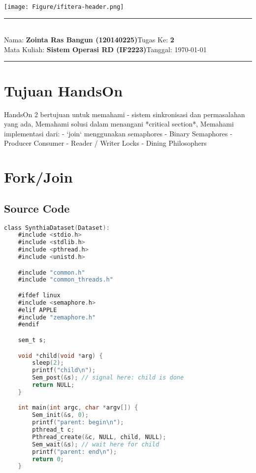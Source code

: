\documentclass[11pt,a4paper]{article}
\newcommand{\stuid}{120140225}
\newcommand{\student}{\textbf{Zointa Ras Bangun (\stuid{})}}
\newcommand{\course}{\textbf{Sistem Operasi RD (IF2223)}}
\newcommand{\assignment}{\textbf{2}} %
\begin{document}
\thispagestyle{empty}
\begin{center}
	\texttt{[image: Figure/ifitera-header.png]}
	\vspace{0.1cm}
\end{center}
\noindent
{\large
\rule{17cm}{0.2cm}\\[0.3cm]
Nama: \student \hfill Tugas Ke: \assignment\\[0.1cm]
Mata Kuliah: \course \hfill Tanggal: \today\\
\rule{17cm}{0.05cm}
\vspace{0.1cm}
}


\section{Tujuan HandsOn}
    HandsOn 2 bertujuan untuk memahami - sistem sinkronisasi dan permasalahan yang ada, Memahami solusi dalam menangani *critical section*, Memahami implementasi dari:
    - `join` menggunakan semaphores
- Binary Semaphores
- Producer Consumer
- Reader / Writer Locks
- Dining Philosophers
    
\section{\textbf{Fork}/Join}
\subsection{Source Code}
    \begin{lstlisting}[language=C,label={labelkode}]
    class SynthiaDataset(Dataset):
    #include <stdio.h>
    #include <stdlib.h>
    #include <pthread.h>
    #include <unistd.h>

    #include "common.h"
    #include "common_threads.h"

    #ifdef linux
    #include <semaphore.h>
    #elif APPLE
    #include "zemaphore.h"
    #endif

    sem_t s;

    void *child(void *arg) {
        sleep(2);
        printf("child\n");
        Sem_post(&s); // signal here: child is done
        return NULL;
    }

    int main(int argc, char *argv[]) {
        Sem_init(&s, 0); 
        printf("parent: begin\n");
        pthread_t c;
        Pthread_create(&c, NULL, child, NULL);
        Sem_wait(&s); // wait here for child
        printf("parent: end\n");
        return 0;
    }
    \end{lstlisting}
\end{document}
